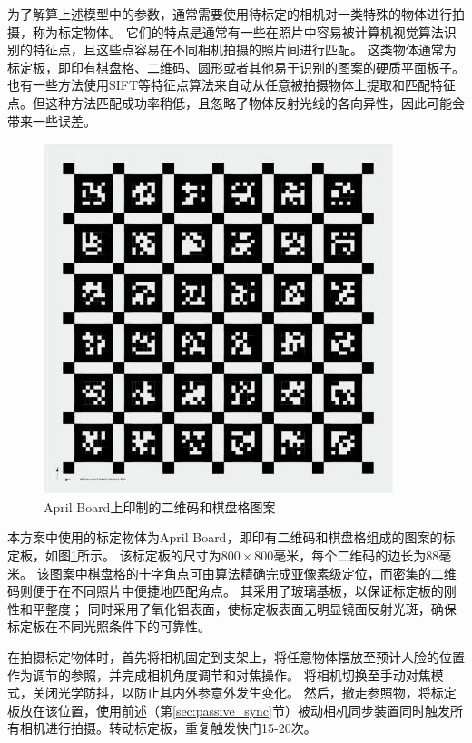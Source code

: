 为了解算上述模型中的参数，通常需要使用待标定的相机对一类特殊的物体进行拍摄，称为标定物体。
它们的特点是通常有一些在照片中容易被计算机视觉算法识别的特征点，且这些点容易在不同相机拍摄的照片间进行匹配。
这类物体通常为标定板，即印有棋盘格、二维码、圆形或者其他易于识别的图案的硬质平面板子。
也有一些方法\cite{colmap}使用SIFT等特征点算法来自动从任意被拍摄物体上提取和匹配特征点。但这种方法匹配成功率稍低，且忽略了物体反射光线的各向异性，因此可能会带来一些误差。

\begin{figure}
    \centering
    \includegraphics[height=0.5\textwidth]{figures/april_board}
    \caption{April Board上印制的二维码和棋盘格图案}
    \label{fig:april_board}
\end{figure}

本方案中使用的标定物体为April Board，即印有二维码和棋盘格组成的图案的标定板，如图\ref{fig:april_board}所示。
该标定板的尺寸为$800 \times 800$毫米，每个二维码的边长为$88$毫米。
该图案中棋盘格的十字角点可由算法精确完成亚像素级定位，而密集的二维码则便于在不同照片中便捷地匹配角点。
其采用了玻璃基板，以保证标定板的刚性和平整度；
同时采用了氧化铝表面，使标定板表面无明显镜面反射光斑，确保标定板在不同光照条件下的可靠性。

在拍摄标定物体时，首先将相机固定到支架上，将任意物体摆放至预计人脸的位置作为调节的参照，并完成相机角度调节和对焦操作。
将相机切换至手动对焦模式，关闭光学防抖，以防止其内外参意外发生变化。
然后，撤走参照物，将标定板放在该位置，使用前述（第\ref{sec:passive_sync}节）被动相机同步装置同时触发所有相机进行拍摄。转动标定板，重复触发快门15-20次。

